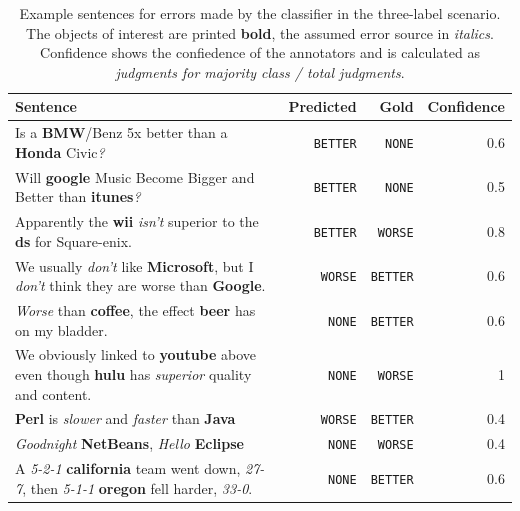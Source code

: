\begin{table}[h]
\caption{Example sentences for errors made by the classifier in the three-label scenario. The objects of interest are printed \textbf{bold}, the assumed error source in \emph{italics}. Confidence shows the confiedence of the annotators and is calculated as \emph{judgments for majority class / total judgments}.}
\label{tbl:3_mistakes}
\begin{tabularx}{\linewidth}{Xrrr}
\toprule
 Sentence & Predicted & Gold & Confidence \\ \midrule
 Is a \textbf{BMW}/Benz 5x better than a \textbf{Honda} Civic\emph{?} & \texttt{BETTER} & \texttt{NONE} & 0.6 \\
 Will \textbf{google} Music Become Bigger and Better than \textbf{itunes}\emph{?}& \texttt{BETTER} & \texttt{NONE} & 0.5 \\

Apparently the \textbf{wii} \emph{isn't} superior to the \textbf{ds} for Square-enix. & \texttt{BETTER} & \texttt{WORSE} & 0.8 \\
 We usually \emph{don't} like \textbf{Microsoft}, but I \emph{don't} think they are worse than \textbf{Google}. & \texttt{WORSE} & \texttt{BETTER} & 0.6 \\

 \emph{Worse} than \textbf{coffee}, the effect \textbf{beer} has on my bladder. & \texttt{NONE} & \texttt{BETTER} & 0.6 \\
 We obviously linked to \textbf{youtube} above even though \textbf{hulu} has \emph{superior} quality and content.  & \texttt{NONE} & \texttt{WORSE} & 1 \\

 \textbf{Perl} is \emph{slower} and \emph{faster} than \textbf{Java} & \texttt{WORSE} & \texttt{BETTER} & 0.4 \\

\emph{Goodnight} \textbf{NetBeans}, \emph{Hello} \textbf{Eclipse} & \texttt{NONE} & \texttt{WORSE} & 0.4 \\

 A \emph{5-2-1} \textbf{california} team went down, \emph{27-7}, then \emph{5-1-1} \textbf{oregon} fell harder, \emph{33-0}. & \texttt{NONE} & \texttt{BETTER} & 0.6 \\



\bottomrule
\end{tabularx}

\end{table}

